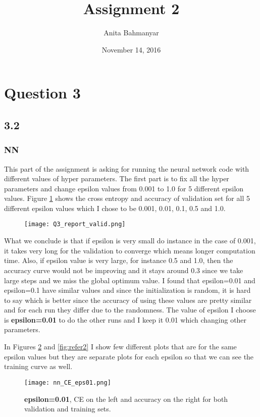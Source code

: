 \documentclass[10pt]{article}
\title{Assignment 2}
\author{Anita Bahmanyar}
\date{November 14, 2016}
\begin{document}
\maketitle


\section*{Question 3}

\subsection*{3.2}
\subsubsection*{NN}
This part of the assignment is asking for running the neural network code with different values of hyper parameters. The first part is to fix all the hyper parameters and change epsilon values from 0.001 to 1.0 for 5 different epsilon values.
Figure \ref{fig:Q3_valid_combined} shows the cross entropy and accuracy of validation set for all 5 different epsilon values which I chose to be 0.001, 0.01, 0.1, 0.5 and 1.0.
\begin{figure}[H]
	\centering
	\texttt{[image: Q3\_report\_valid.png]}
	\caption{}
	\label{fig:Q3_valid_combined}
\end{figure}
What we conclude is that if epsilon is very small do instance in the case of 0.001, it takes very long for the validation to converge which means longer computation time. Also, if epsilon value is very large, for instance 0.5 and 1.0, then the accuracy curve would not be improving and it stays around 0.3 since we take large steps and we miss the global optimum value. I found that epsilon=0.01 and epsilon=0.1 have similar values and since the initialization is random, it is hard to say which is better since the accuracy of using these values are pretty similar and for each run they differ due to the randomness. The value of epsilon I choose is \textbf{epsilon=0.01} to do the other runs and I keep it 0.01 which changing other parameters.

In Figures \ref{fig:refer1} and \ref{fig:refer2} I show few different plots that are for the same epsilon values but they are separate plots for each epsilon so that we can see the training curve as well.
\begin{figure}[H]
	\centering
	\texttt{[image: nn\_CE\_eps01.png]}
	\caption{\textbf{epsilon=0.01}, CE on the left and accuracy on the right for both validation and training sets.}
	\label{fig:refer1}
\end{figure}
\end{document}
